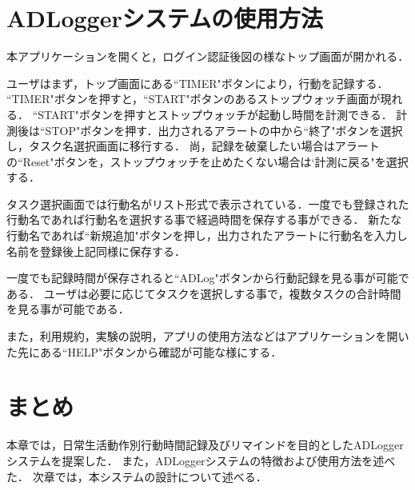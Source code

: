 \section{ADLoggerシステムの使用方法}
本アプリケーションを開くと，ログイン認証後図の様なトップ画面が開かれる．%

ユーザはまず，トップ画面にある``TIMER"ボタンにより，行動を記録する．
``TIMER"ボタンを押すと，``START"ボタンのあるストップウォッチ画面が現れる．
``START"ボタンを押すとストップウォッチが起動し時間を計測できる．
計測後は``STOP"ボタンを押す．出力されるアラートの中から``終了"ボタンを選択し，タスク名選択画面に移行する．
尚，記録を破棄したい場合はアラートの``Reset"ボタンを，ストップウォッチを止めたくない場合は`計測に戻る"を選択する．

タスク選択画面では行動名がリスト形式で表示されている．一度でも登録された行動名であれば行動名を選択する事で経過時間を保存する事ができる．
新たな行動名であれば``新規追加"ボタンを押し，出力されたアラートに行動名を入力し名前を登録後上記同様に保存する．

一度でも記録時間が保存されると``ADLog"ボタンから行動記録を見る事が可能である．
ユーザは必要に応じてタスクを選択しする事で，複数タスクの合計時間を見る事が可能である．

また，利用規約，実験の説明，アプリの使用方法などはアプリケーションを開いた先にある``HELP"ボタンから確認が可能な様にする．


\section{まとめ}
本章では，日常生活動作別行動時間記録及びリマインドを目的としたADLoggerシステムを提案した．
また，ADLoggerシステムの特徴および使用方法を述べた．
次章では，本システムの設計について述べる．